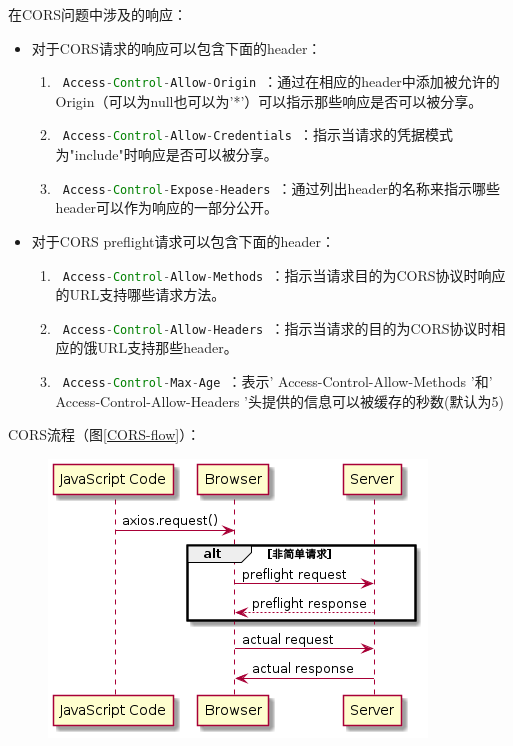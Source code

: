 \begin{enumerate}
\begin{itemize}
        \end{itemize}
        在CORS问题中涉及的响应：
        \begin{itemize}
          \item 对于CORS请求的响应可以包含下面的header：
                \begin{enumerate}
                  \item \lstinline[language = Java]| Access-Control-Allow-Origin |：通过在相应的header中添加被允许的Origin（可以为null也可以为'*'）可以指示那些响应是否可以被分享。
                  \item \lstinline[language = Java]| Access-Control-Allow-Credentials |：指示当请求的凭据模式为"include"时响应是否可以被分享。
                  \item \lstinline[language = Java]| Access-Control-Expose-Headers |：通过列出header的名称来指示哪些header可以作为响应的一部分公开。
                \end{enumerate}
          \item 对于CORS preflight请求可以包含下面的header：
                \begin{enumerate}
                  \item \lstinline[language = Java]| Access-Control-Allow-Methods |：指示当请求目的为CORS协议时响应的URL支持哪些请求方法。
                  \item \lstinline[language = Java]| Access-Control-Allow-Headers |：指示当请求的目的为CORS协议时相应的饿URL支持那些header。
                  \item \lstinline[language = Java]| Access-Control-Max-Age |：表示' Access-Control-Allow-Methods '和' Access-Control-Allow-Headers '头提供的信息可以被缓存的秒数(默认为5)
                \end{enumerate}
        \end{itemize}
        CORS流程（图\ref{CORS-flow}）：
        \begin{figure}[H]
          \centering
          \includegraphics[scale = 0.6]{out/uml/时序图/CORS-flow/CORS-flow.png}

\end{figure}
\end{enumerate}
